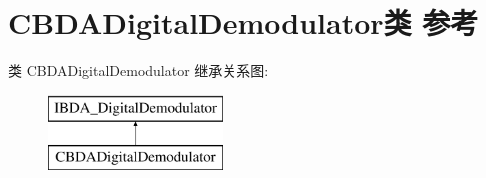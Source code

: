 \hypertarget{class_c_b_d_a_digital_demodulator}{}\section{C\+B\+D\+A\+Digital\+Demodulator类 参考}
\label{class_c_b_d_a_digital_demodulator}
类 C\+B\+D\+A\+Digital\+Demodulator 继承关系图\+:\begin{figure}[H]
\begin{center}
\leavevmode
\includegraphics[height=2.000000cm]{class_c_b_d_a_digital_demodulator}
\end{center}
\end{figure}
